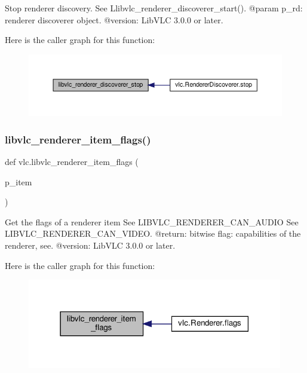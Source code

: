 \begin{DoxyVerb}Stop renderer discovery.
See L{libvlc_renderer_discoverer_start}().
@param p_rd: renderer discoverer object.
@version: LibVLC 3.0.0 or later.
\end{DoxyVerb}
 Here is the caller graph for this function\+:
\nopagebreak
\begin{figure}[H]
\begin{center}
\leavevmode
\includegraphics[width=350pt]{namespacevlc_a2fab3a4810e94af669b4ac595dd32632_icgraph}
\end{center}
\end{figure}
\mbox{\label{namespacevlc_ad174676e7111c33c43ffdee9650725fd}} 
\subsubsection{\texorpdfstring{libvlc\+\_\+renderer\+\_\+item\+\_\+flags()}{libvlc\_renderer\_item\_flags()}}
{\footnotesize\ttfamily def vlc.\+libvlc\+\_\+renderer\+\_\+item\+\_\+flags (\begin{DoxyParamCaption}\item[{}]{p\+\_\+item }\end{DoxyParamCaption})}

\begin{DoxyVerb}Get the flags of a renderer item
See LIBVLC_RENDERER_CAN_AUDIO
See LIBVLC_RENDERER_CAN_VIDEO.
@return: bitwise flag: capabilities of the renderer, see.
@version: LibVLC 3.0.0 or later.
\end{DoxyVerb}
 Here is the caller graph for this function\+:
\nopagebreak
\begin{figure}[H]
\begin{center}
\leavevmode
\includegraphics[width=316pt]{namespacevlc_ad174676e7111c33c43ffdee9650725fd_icgraph}
\end{center}
\end{figure}
\mbox{\label{namespacevlc_a18b5ce5a1f7fedb1834c9f80d444b08e}} 
